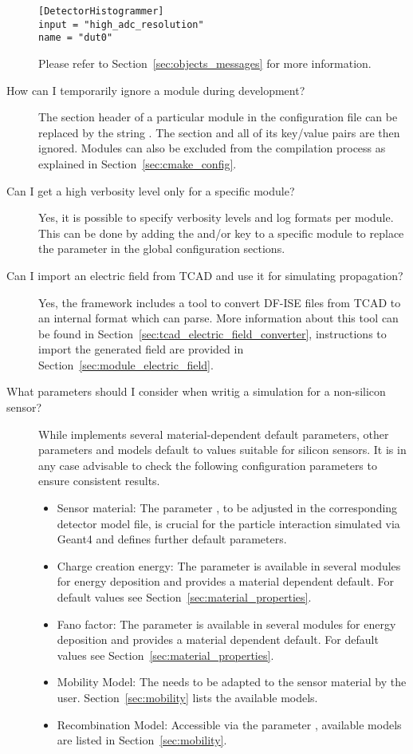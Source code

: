 \begin{description}
\begin{verbatim}
[DetectorHistogrammer]
input = "high_adc_resolution"
name = "dut0"
\end{verbatim}
Please refer to Section~\ref{sec:objects_messages} for more information.
\item[How can I temporarily ignore a module during development?]
The section header of a particular module in the configuration file can be replaced by the string .
The section and all of its key/value pairs are then ignored.
Modules can also be excluded from the compilation process as explained in Section~\ref{sec:cmake_config}.
\item[Can I get a high verbosity level only for a specific module?]
Yes, it is possible to specify verbosity levels and log formats per module.
This can be done by adding the  and/or  key to a specific module to replace the parameter in the global configuration sections.

\item[Can I import an electric field from TCAD and use it for simulating propagation?]
Yes, the framework includes a tool to convert DF-ISE files from TCAD to an internal format which \apsq can parse.
More information about this tool can be found in Section~\ref{sec:tcad_electric_field_converter}, instructions to import the generated field are provided in Section~\ref{sec:module_electric_field}.

\item[What parameters should I consider when writig a simulation for a non-silicon sensor?]
While \apsq implements several material-dependent default parameters, other parameters and models default to values suitable for silicon sensors.
It is in any case advisable to check the following configuration parameters to ensure consistent results.
\begin{itemize}
\item Sensor material: The parameter , to be adjusted in the corresponding detector model file, is crucial for the particle interaction simulated via Geant4 and defines further default parameters.
\item Charge creation energy: The parameter  is available in several modules for energy deposition and provides a material dependent default. For default values see Section~\ref{sec:material_properties}.
\item Fano factor: The parameter  is available in several modules for energy deposition and provides a material dependent default. For default values see Section~\ref{sec:material_properties}.
\item Mobility Model: The  needs to be adapted to the sensor material by the user. Section~\ref{sec:mobility} lists the available models.
\item Recombination Model: Accessible via the parameter , available models are listed in Section~\ref{sec:mobility}.
\end{itemize}
  
\end{description}


